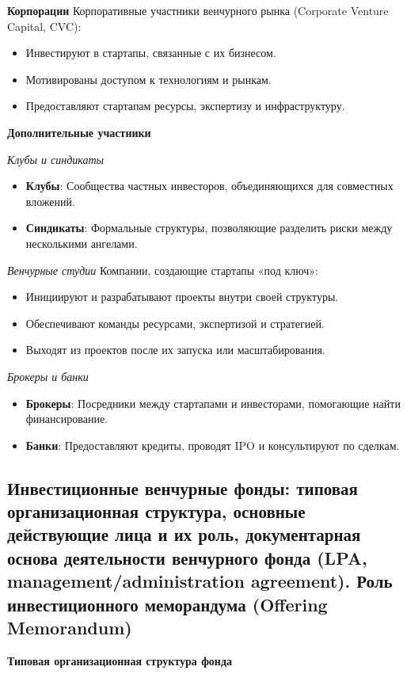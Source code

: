 \textbf{Корпорации}
Корпоративные участники венчурного рынка (Corporate Venture Capital, CVC):
\begin{itemize}
    \item Инвестируют в стартапы, связанные с их бизнесом.
    \item Мотивированы доступом к технологиям и рынкам.
    \item Предоставляют стартапам ресурсы, экспертизу и инфраструктуру.
\end{itemize}

\textbf{Дополнительные участники}

\textit{Клубы и синдикаты}
\begin{itemize}
    \item \textbf{Клубы}: Сообщества частных инвесторов, объединяющихся для совместных вложений.
    \item \textbf{Синдикаты}: Формальные структуры, позволяющие разделить риски между несколькими ангелами.
\end{itemize}

\textit{Венчурные студии}
Компании, создающие стартапы «под ключ»:
\begin{itemize}
    \item Инициируют и разрабатывают проекты внутри своей структуры.
    \item Обеспечивают команды ресурсами, экспертизой и стратегией.
    \item Выходят из проектов после их запуска или масштабирования.
\end{itemize}

\textit{Брокеры и банки}
\begin{itemize}
    \item \textbf{Брокеры}: Посредники между стартапами и инвесторами, помогающие найти финансирование.
    \item \textbf{Банки}: Предоставляют кредиты, проводят IPO и консультируют по сделкам.
\end{itemize}

\pagebreak
\subsection{Инвестиционные венчурные фонды: типовая организационная структура, основные действующие лица и их роль, документарная основа деятельности венчурного фонда (LPA, management/administration agreement). Роль инвестиционного меморандума (Offering Memorandum)}

\textbf{Типовая организационная структура фонда}

